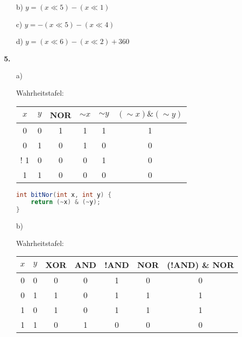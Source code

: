 \documentclass[a4paper,10pt]{scrartcl}
\begin{document}
\begin{enumerate}
\begin{enumerate}
            \item[b)]
                $y = (x \ll 5) - (x \ll 1)$

            \item[c)]
                $y = - (x \ll 5) - (x \ll 4)$

            \item[d)]
                $y = (x \ll 6) - (x \ll 2) + 360$
        \end{enumerate}

    \item[\textbf{5.}]
        \begin{enumerate}
            \item[a)]

                Wahrheitstafel:

                \begin{tabular}{c|c||c|c|c|c}
                    $x$ & $y$ & NOR & $\sim x$ & $\sim y$ & $(\sim x) \& (\sim y)$\\
                    \hline
                    \hline
                    0 & 0 &  1  &  1 &  1 &      1\\
                    0 & 1 &  0  &  1 &  0 &      0\\!
                    1 & 0 &  0  &  0 &  1 &      0\\
                    1 & 1 &  0  &  0 &  0 &      0\\
                \end{tabular}

                \begin{lstlisting}[language=java]
int bitNor(int x, int y) {
    return (~x) & (~y);
}
                \end{lstlisting}

            \item[b)]

                Wahrheitstafel:

                \begin{tabular}{c|c||c|c|c|c|c}
                    $x$ & $y$ & XOR & AND & !AND & NOR & (!AND) \& NOR \\
                    \hline
                    \hline
                    0 & 0 &  0  &  0 &  1 & 0 & 0\\
                    0 & 1 &  1  &  0 &  1 & 1 & 1\\
                    1 & 0 &  1  &  0 &  1 & 1 & 1\\
                    1 & 1 &  0  &  1 &  0 & 0 & 0
                \end{tabular}


\end{enumerate}
\end{enumerate}
\end{document}
